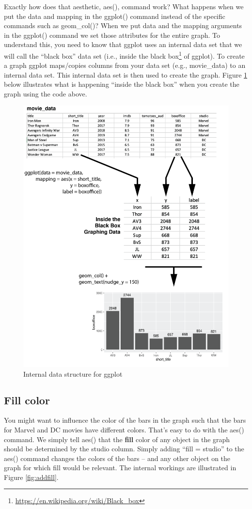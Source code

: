 \documentclass[
]{krantz}
\renewcommand{\href}[2]{#2\footnote{\url{#1}}}
\begin{document}
Exactly how does that aesthetic, aes(), command work? What happens when we put the data and mapping in the ggplot() command instead of the specific commands such as geom\_col()? When we put data and the mapping arguments in the ggplot() command we set those attributes for the entire graph. To understand this, you need to know that ggplot uses an internal data set that we will call the ``black box'' data set (i.e., inside the \href{https://en.wikipedia.org/wiki/Black_box}{black box} of ggplot). To create a graph ggplot maps/copies columns from your data set (e.g., movie\_data) to an internal data set. This internal data set is then used to create the graph. Figure \ref{fig:showmap} below illustrates what is happening ``inside the black box'' when you create the graph using the code above.

\begin{figure}
\includegraphics[width=0.7\linewidth]{ch_graphing/images/mapping} \caption{Internal data structure for ggplot}\label{fig:showmap}
\end{figure}

\hypertarget{fill-color}{%
\subsection{Fill color}\label{fill-color}}

You might want to influence the color of the bars in the graph such that the bars for Marvel and DC movies have different colors. That's easy to do with the aes() command. We simply tell aes() that the \textbf{fill} color of any object in the graph should be determined by the studio column. Simply adding ``fill = studio'' to the aes() command changes the colors of the bars -- and any other object on the graph for which fill would be relevant. The internal workings are illustrated in Figure \ref{fig:addfill}.
\end{document}

